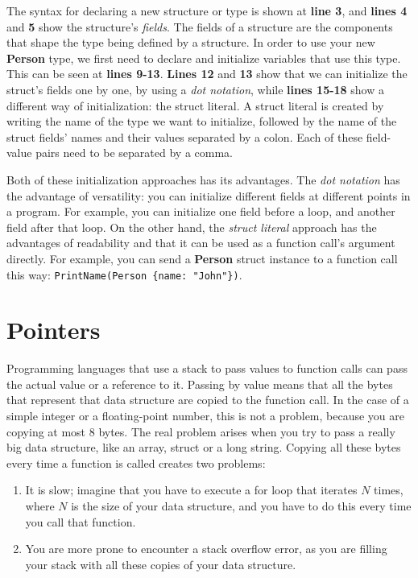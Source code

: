 \documentclass[11pt,fleqn,openany]{book} %
\begin{document}
The syntax for declaring a new structure or type is shown at \textbf{line 3}, and \textbf{lines 4} and \textbf{5} show the structure's \emph{fields}. The fields of a structure are the components that shape the type being defined by a structure. In order to use your new \textbf{Person} type, we first need to declare and initialize variables that use this type. This can be seen at \textbf{lines 9-13}. \textbf{Lines 12} and \textbf{13} show that we can initialize the struct's fields one by one, by using a \emph{dot notation}, while \textbf{lines 15-18} show a different way of initialization: the struct literal. A struct literal is created by writing the name of the type we want to initialize, followed by the name of the struct fields' names and their values separated by a colon. Each of these field-value pairs need to be separated by a comma.

Both of these initialization approaches has its advantages. The \emph{dot notation} has the advantage of versatility: you can initialize different fields at different points in a program. For example, you can initialize one field before a loop, and another field after that loop. On the other hand, the \emph{struct literal} approach has the advantages of readability and that it can be used as a function call's argument directly. For example, you can send a \textbf{Person} struct instance to a function call this way: \lstinline|PrintName(Person {name: "John"})|.


\section{Pointers}
\label{section:pointers}

Programming languages that use a stack to pass values to function calls can pass the actual value or a reference to it. Passing by value means that all the bytes that represent that data structure are copied to the function call. In the case of a simple integer or a floating-point number, this is not a problem, because you are copying at most 8 bytes. The real problem arises when you try to pass a really big data structure, like an array, struct or a long string. Copying all these bytes every time a function is called creates two problems:
\begin{enumerate}
    \item It is slow; imagine that you have to execute a for loop that iterates $N$ times, where $N$ is the size of your data structure, and you have to do this every time you call that function.
    \item You are more prone to encounter a stack overflow error, as you are filling your stack with all these copies of your data structure.
\end{enumerate}
\end{document}
